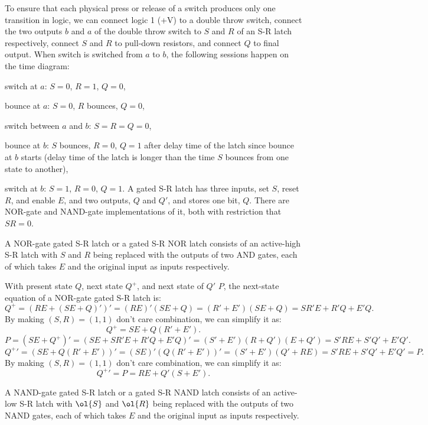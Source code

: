 \documentclass[a4paper,12pt]{report}
\begin{document}
To ensure that each physical press or release of a switch produces only one transition in logic, we can connect logic 1 (+V) to a double throw switch, connect the two outputs $b$ and $a$ of the double throw switch to $S$ and $R$ of an S-R latch respectively, connect $S$ and $R$ to pull-down resistors, and connect $Q$ to final output. When switch is switched from $a$ to $b$, the following sessions happen on the time diagram:
\ben
\item switch at $a$: $S=0$, $R=1$, $Q=0$,
\item bounce at $a$: $S=0$, $R$ bounces, $Q=0$,
\item switch between $a$ and $b$: $S=R=Q=0$,
\item bounce at $b$: $S$ bounces, $R=0$, $Q=1$ after delay time of the latch since bounce at $b$ starts (delay time of the latch is longer than the time $S$ bounces from one state to another),
\item switch at $b$: $S=1$, $R=0$, $Q=1$.
\een
{}
A gated S-R latch has three inputs, set $S$, reset $R$, and enable $E$, and two outputs, $Q$ and $Q'$, and stores one bit, $Q$. There are NOR-gate and NAND-gate implementations of it, both with restriction that $SR=0$.
\bit
\item A NOR-gate gated S-R latch or a gated S-R NOR latch consists of an active-high S-R latch with $S$ and $R$ being replaced with the outputs of two AND gates, each of which takes $E$ and the original input as inputs respectively.

With present state $Q$, next state $Q^+$, and next state of $Q'$ $P$, the next-state equation of a NOR-gate gated S-R latch is:
\[Q^+=(RE+(SE+Q)')'=(RE)'(SE+Q)=(R'+E')(SE+Q)=SR'E+R'Q+E'Q.\]
By making $(S,R)=(1,1)$ don't care combination, we can simplify it as:
\[Q^+=SE+Q(R'+E').\]
\[P=(SE+Q^+)'=(SE+SR'E+R'Q+E'Q)'=(S'+E')(R+Q')(E+Q')=S'RE+S'Q'+E'Q'.\]
\[{Q^+}'=(SE+Q(R'+E'))'=(SE)'(Q(R'+E'))'=(S'+E')(Q'+RE)=S'RE+S'Q'+E'Q'=P.\]
By making $(S,R)=(1,1)$ don't care combination, we can simplify it as:
\[{Q^+}'=P=RE+Q'(S+E').\]
\item A NAND-gate gated S-R latch or a gated S-R NAND latch consists of an active-low S-R latch with $\ol{S}$ and $\ol{R}$ being replaced with the outputs of two NAND gates, each of which takes $E$ and the original input as inputs respectively.
\end{document}
